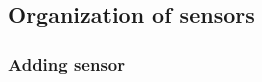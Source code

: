 \documentclass[12pt]{article}
\newcommand{\prio}[1]{\ifthenelse{\equal{#1}{1}}{low}{\ifthenelse{\equal{#1}{2}}{medium}{\ifthenelse{\equal{#1}{3}}{high}{\textbf{INVALID!}}}}\relax}
\newcounter{fr}
\newcommand{\fr}[8]{
\refstepcounter{fr}\label{#8}
\begin{tabularx}{16cm}{l|X}
 & \textbf{#1} \hfill \textbf{FR\arabic{fr}} \\ \hline
Description & #2\\ \hline
\ifthenelse{\equal{#3}{}}{}{Precondition & #3 \\ \hline}
\ifthenelse{\equal{#4}{}}{}{Postcondition & #4 \\ \hline}
Rationale & #5
\ifthenelse{\equal{#6}{}}{}{\\ \hline Dependencies & #6} 
\ifthenelse{\equal{#7}{}}{}{ \\ \hline Priority & \prio{#7}}
\end{tabularx}
\vspace*{0.75cm}
}
\newcommand{\frref}[1]{FR\ref{#1}\textsuperscript{$\rightarrow$ p. \pageref{#1}}}
\begin{document}




\subsection{Organization of sensors}
\label{ssec:Organization of sensors}
\subsubsection{Adding sensor}

\end{document}
